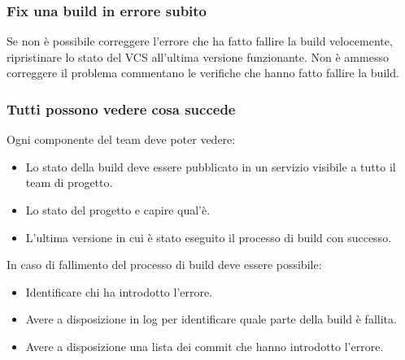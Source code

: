 \subsubsection{Fix una build in errore subito}
Se non è possibile correggere l’errore che ha fatto fallire la build velocemente, ripristinare lo stato del VCS all’ultima versione funzionante.
Non è ammesso correggere il problema commentano le verifiche che hanno fatto fallire la build.

\subsubsection{Tutti possono vedere cosa succede}
Ogni componente del team deve poter vedere:
\begin{itemize}
    \item Lo stato della build deve essere pubblicato in un servizio visibile a tutto il team di progetto.
    \item Lo stato del progetto e capire qual’è.
    \item L’ultima versione in cui è stato eseguito il processo di build con successo.
\end{itemize}
In caso di fallimento del processo di build deve essere possibile:
\begin{itemize}
    \item Identificare chi ha introdotto l’errore.
    \item Avere a disposizione in log per identificare quale parte della build è fallita.
    \item Avere a disposizione una lista dei commit che hanno introdotto l’errore.
\end{itemize}

\newpage